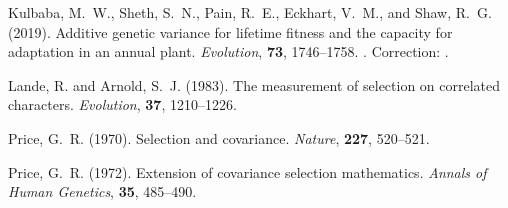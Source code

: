 \documentclass[11pt]{article}
\begin{document}
\begin{thebibliography}{}
Kulbaba, M.~W., Sheth, S.~N., Pain, R.~E., Eckhart, V.~M., and
    Shaw, R.~G. (2019).
\newblock Additive genetic variance for lifetime fitness and the capacity
    for adaptation in an annual plant.
\newblock \emph{Evolution}, \textbf{73}, 1746--1758.
\newblock {}.
\newblock Correction: \citet{zenodo}.

Lande, R. and Arnold, S.~J. (1983).
\newblock The measurement of selection on correlated characters.
\newblock \emph{Evolution}, \textbf{37}, 1210--1226.

Price, G.~R. (1970).
\newblock Selection and covariance.
\newblock \emph{Nature}, \textbf{227}, 520--521.

Price, G.~R. (1972).
\newblock Extension of covariance selection mathematics.
\newblock \emph{Annals of Human Genetics}, \textbf{35}, 485--490.


\end{thebibliography}
\end{document}
